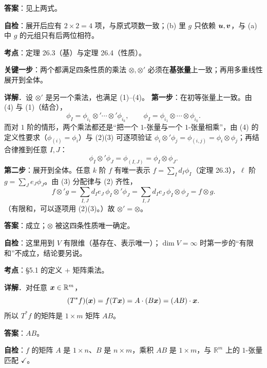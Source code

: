 \documentclass[11pt]{ctexart}
\renewcommand{\qbreak}{\needspace{0.22\textheight}}
\begin{document}
\textbf{答案}：见上两式。

\textbf{自检}：展开后应有 $2\times2=4$ 项，与原式项数一致；(b) 里 $g$ 只依赖 $\boldsymbol{u},\boldsymbol{v}$，与 (a) 中 $g$ 的元组只有后两位相符。

\qbreak
{}\label{ax7}
\qbreak
{}

\textbf{考点}：定理 26.3（基）与定理 26.4（性质）。

\textbf{关键一步}：两个都满足四条性质的乘法 $\otimes,\otimes'$ 必须在\textbf{基张量}上一致；再用多重线性展开到全体。

\textbf{详解}．设 $\otimes'$ 是另一个乘法，也满足 (1)--(4)。
\textbf{第一步}：在初等张量上一致。由 (4) 与 (1)（结合），
\[ \phi_I=\phi_{i_1}\otimes'\cdots\otimes'\phi_{i_k},\qquad \phi_I=\phi_{i_1}\otimes\cdots\otimes\phi_{i_k}. \]
而对 $1$ 阶的情形，两个乘法都还是“把一个 $1$-张量与一个 $1$-张量相乘”，由 (4) 的定义性要求（$\phi_{(i)}=\phi_i$）与 (2)(3) 可逐项验证 $\phi_i\otimes'\phi_j=\phi_{(i,j)}=\phi_i\otimes\phi_j$；再结合律推到任意 $I,J$：
\[ \phi_I\otimes'\phi_J=\phi_{(I,J)}=\phi_I\otimes\phi_J. \]
\textbf{第二步}：展开到全体。任意 $k$ 阶 $f$ 有唯一表示 $f=\sum_Id_I\phi_I$（定理 26.3），$\ell$ 阶 $g=\sum_Je_J\phi_J$。由 (3) 分配律与 (2) 齐性，
\[ f\otimes'g=\sum_{I,J}d_Ie_J\,\phi_I\otimes'\phi_J=\sum_{I,J}d_Ie_J\,\phi_I\otimes\phi_J=f\otimes g. \]
（有限和，可以逐项用 (2)(3)。）故 $\otimes'=\otimes$。

\textbf{答案}：成立；$\otimes$ 被这四条性质唯一确定。

\textbf{自检}：这里用到 $V$ 有限维（基存在、表示唯一）；$\dim V=\infty$ 时第一步的“有限和”不成立，结论要另说。

\qbreak
{}\label{ax8}
\qbreak
{}

\textbf{考点}：§5.1 的定义 + 矩阵乘法。

\textbf{详解}．对任意 $\boldsymbol{x}\in\mathbb R^m$，
\[ (T^*f)(\boldsymbol{x})=f(T\boldsymbol{x})=A\cdot(B\boldsymbol{x})=(AB)\cdot\boldsymbol{x}. \]
所以 $T^*f$ 的矩阵是 $1\times m$ 矩阵 $AB$。

\textbf{答案}：$AB$。

\textbf{自检}：$f$ 的矩阵 $A$ 是 $1\times n$、$B$ 是 $n\times m$，乘积 $AB$ 是 $1\times m$，与 $\mathbb R^m$ 上的 $1$-张量匹配 $\checkmark$。
\end{document}
